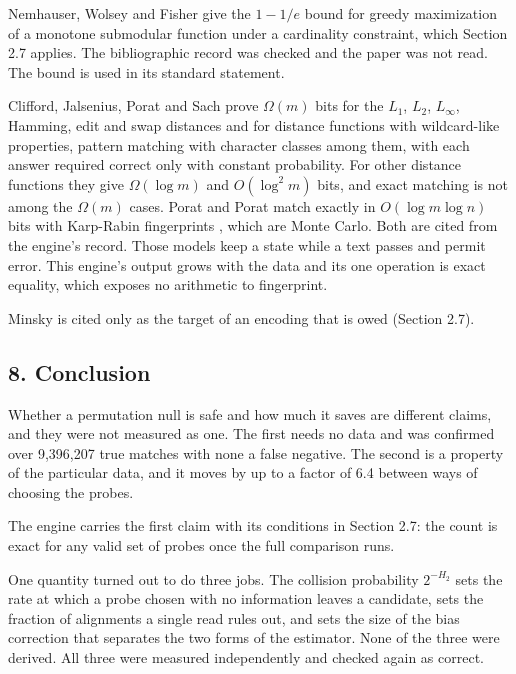 Nemhauser, Wolsey and Fisher \cite{src:Nemhauser-Wolsey-and-Fisher} give the \(1 - 1/e\) bound for greedy maximization of a monotone submodular function under a cardinality constraint, which Section 2.7 applies. The bibliographic record was checked and the paper was not read. The bound is used in its standard statement.

Clifford, Jalsenius, Porat and Sach \cite{src:Clifford-Jalsenius-Porat-and-Sach} prove \(\Omega(m)\) bits for the \(L_1\), \(L_2\), \(L_\infty\), Hamming, edit and swap distances and for distance functions with wildcard-like properties, pattern matching with character classes among them, with each answer required correct only with constant probability. For other distance functions they give \(\Omega(\log m)\) and \(O(\log^2 m)\) bits, and exact matching is not among the \(\Omega(m)\) cases. Porat and Porat \cite{src:Porat-and-Porat} match exactly in \(O(\log m \log n)\) bits with Karp-Rabin fingerprints \cite{src:Karp-Rabin}, which are Monte Carlo. Both are cited from the engine's record. Those models keep a state while a text passes and permit error. This engine's output grows with the data and its one operation is exact equality, which exposes no arithmetic to fingerprint.

Minsky \cite{src:Minsky} is cited only as the target of an encoding that is owed (Section 2.7).

\subsection{8. Conclusion}

Whether a permutation null is safe and how much it saves are different claims, and they were not
measured as one. The first needs no data and was confirmed over 9,396,207 true matches with none a
false negative. The second is a property of the particular data, and it moves by up to a factor of
6.4 between ways of choosing the probes.

The engine carries the first claim with its conditions in Section 2.7: the count is exact for any
valid set of probes once the full comparison runs.

One quantity turned out to do three jobs. The collision probability \(2^{-H_2}\) sets the rate at
which a probe chosen with no information leaves a candidate, sets the fraction of alignments a
single read rules out, and sets the size of the bias correction that separates the two forms of the
estimator. None of the three were derived. All three were measured independently and checked again
as correct.

